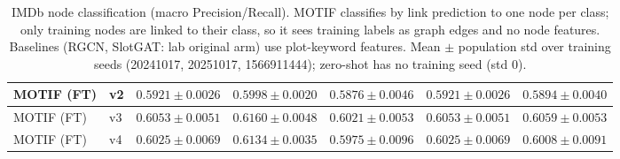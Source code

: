 \begin{table}[t]
\begin{tabular}{||l||l||c|c|c||c|c||}
\hline
MOTIF (FT) & v2 & $0.5921 \pm 0.0026$ & $0.5998 \pm 0.0020$ & $0.5876 \pm 0.0046$ & $0.5921 \pm 0.0026$ & $0.5894 \pm 0.0040$ \\
\hline
MOTIF (FT) & v3 & $0.6053 \pm 0.0051$ & $0.6160 \pm 0.0048$ & $0.6021 \pm 0.0053$ & $0.6053 \pm 0.0051$ & $0.6059 \pm 0.0053$ \\
\hline
MOTIF (FT) & v4 & $0.6025 \pm 0.0069$ & $0.6134 \pm 0.0035$ & $0.5975 \pm 0.0096$ & $0.6025 \pm 0.0069$ & $0.6008 \pm 0.0091$ \\
\hline
\end{tabular}
\caption{IMDb node classification (macro Precision/Recall). MOTIF classifies by link prediction to one node per class; only training nodes are linked to their class, so it sees training labels as graph edges and no node features. Baselines (RGCN, SlotGAT: lab original arm) use plot-keyword features. Mean $\pm$ population std over training seeds (20241017, 20251017, 1566911444); zero-shot has no training seed (std 0). }
\label{tab:nc_imdb_seed_performance}
\end{table}
